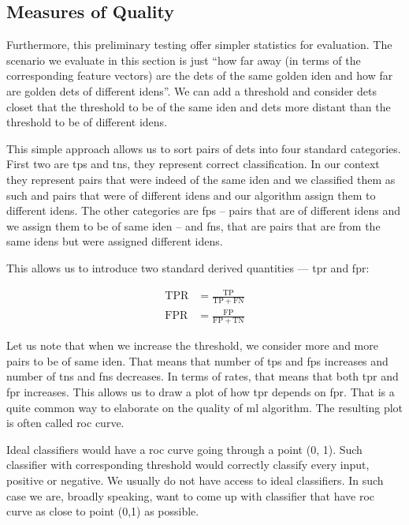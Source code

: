 \subsection{Measures of Quality}

Furthermore, this preliminary testing offer simpler statistics for evaluation.
The scenario we evaluate in this section is just ``how far away (in terms of
the corresponding feature vectors) are the \glspl{det} of the same golden
\gls{iden} and how far are golden \glspl{det} of different \glspl{iden}''. We
can add a threshold and consider \glspl{det} closet that the threshold to be
of the same \gls{iden} and \glspl{det} more distant than the threshold to be
of different \glspl{iden}.

This simple approach allows us to sort pairs of \glspl{det} into four standard
categories. First two are \glspl{tp} and \glspl{tn}, they represent
correct classification. In our context they represent pairs that were indeed
of the same \gls{iden} and we classified them as such and pairs that were of
different \glspl{iden} and our algorithm assign them to different \glspl{iden}.
The other categories are \glspl{fp} -- pairs that are of different
\glspl{iden} and we assign them to be of same \gls{iden} -- and \glspl{fn},
that are pairs that are from the same \glspl{iden} but were assigned different
\glspl{iden}.

This allows us to introduce two standard derived quantities --- \gls{tpr} and
\gls{fpr}:

\begin{align*}
    \mathrm{TPR} &= \frac{\mathrm{TP}}{\mathrm{TP} + \mathrm{FN}} \\
    \mathrm{FPR} &= \frac{\mathrm{FP}}{\mathrm{FP} + \mathrm{TN}}
\end{align*}

Let us note that when we increase the threshold, we consider more and more
pairs to be of same \gls{iden}. That means that number of \glspl{tp} and
\glspl{fp} increases and number of \glspl{tn} and \glspl{fn} decreases.
In terms of rates, that means that both \gls{tpr} and \gls{fpr} increases.
This allows us to draw a plot of how \gls{tpr} depends on \gls{fpr}. That
is a quite common way to elaborate on the quality of \gls{ml} algorithm.
The resulting plot is often called \gls{roc} curve.

Ideal classifiers would have a \gls{roc} curve going through a point
(0, 1). Such classifier with corresponding threshold would correctly
classify every input, positive or negative. We usually do not
have access to ideal classifiers. In such case we are, broadly speaking,
want to come up with classifier that have \gls{roc} curve as close to
point (0,1) as possible.

